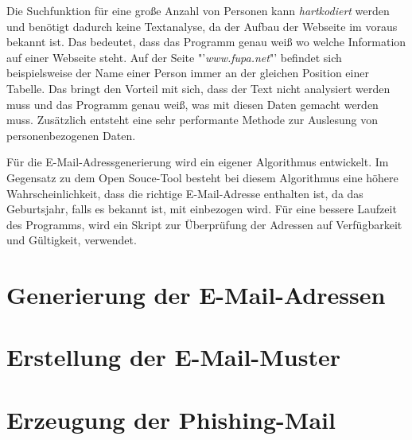 Die Suchfunktion für eine große Anzahl von Personen kann \textit{hartkodiert} werden und benötigt dadurch keine Textanalyse, da der Aufbau der Webseite im voraus bekannt ist. Das bedeutet, dass das Programm genau weiß wo welche Information auf einer Webseite steht. Auf der Seite "'\textit{www.fupa.net}"' befindet sich beispielsweise der Name einer Person immer an der gleichen Position einer Tabelle. Das bringt den Vorteil mit sich, dass der Text nicht analysiert werden muss und das Programm genau weiß, was mit diesen Daten gemacht werden muss. Zusätzlich entsteht eine sehr performante Methode zur Auslesung von personenbezogenen Daten.

Für die E-Mail-Adressgenerierung wird ein eigener Algorithmus entwickelt. Im Gegensatz zu dem Open Souce-Tool \cite{Bazzell} besteht bei diesem Algorithmus eine höhere Wahrscheinlichkeit, dass die richtige E-Mail-Adresse enthalten ist, da das Geburtsjahr, falls es bekannt ist, mit einbezogen wird. Für eine bessere Laufzeit des Programms, wird ein Skript zur Überprüfung der Adressen auf Verfügbarkeit und Gültigkeit, verwendet.

\section{Generierung der E-Mail-Adressen}

\section{Erstellung der E-Mail-Muster}

\section{Erzeugung der Phishing-Mail}